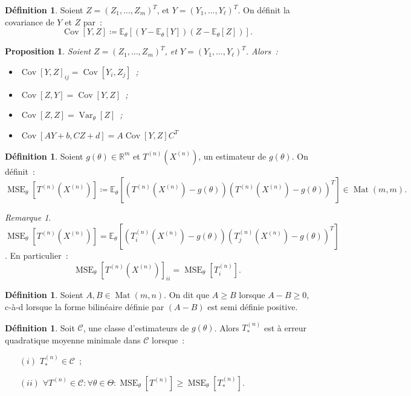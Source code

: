 \documentclass{report}
\DeclareMathOperator{\Mat}{Mat}
\DeclareMathOperator{\Var}{Var}
\DeclareMathOperator{\Cov}{Cov}
\DeclareMathOperator{\MSE}{MSE}
\newcommand{\E}{\mathbb E}
\newcommand{\R}{\mathbb R}
\newcommand{\Xn}{{X^{(n)}}}
\newcommand{\Tn}{{T^{(n)}}}
\newcommand{\TnXn}{{\Tn(\Xn)}}
\newtheorem{prp}[thm]{Proposition}
\theoremstyle{definition}
\newtheorem{déf}[thm]{Définition}
\theoremstyle{remark}
\newtheorem*{rmq}{Remarque}
\begin{document}
			\begin{déf} Soient $Z = (Z_1, \ldots, Z_m)^T$, et $Y = (Y_1, \ldots, Y_\ell)^T$. On définit la covariance de $Y$ et $Z$ par~:
			\[\Cov[Y, Z] \coloneqq \E_\theta\left[(Y-\E_\theta[Y])(Z-\E_\theta[Z])\right].\]
			\end{déf}

			\begin{prp} Soient $Z = (Z_1, \ldots, Z_m)^T$, et $Y = (Y_1, \ldots, Y_\ell)^T$. Alors~:
			\begin{itemize}
				\item $\Cov[Y, Z]_{ij} = \Cov[Y_i, Z_j]$~;
				\item $\Cov[Z, Y] = \Cov[Y, Z]$~;
				\item $\Cov[Z, Z] = \Var_\theta[Z]$~;
				\item $\Cov[AY+b, CZ+d] = A\Cov[Y, Z]C^T$
			\end{itemize}
			\end{prp}

			\begin{déf} Soient $g(\theta) \in \R^m$ et $\TnXn$, un estimateur de $g(\theta)$. On définit~:
			\[\MSE_\theta[\TnXn] \coloneqq \E_\theta\left[(\TnXn - g(\theta))(\TnXn - g(\theta))^T\right] \in \Mat(m, m).\]
			\end{déf}

			\begin{rmq} $\MSE_\theta[\TnXn] = \E_\theta\left[\left(T_i^{(n)}(\Xn)-g(\theta)\right)\left(T_j^{(n)}(\Xn)-g(\theta)\right)^T\right]$. En particulier~:
			\[\MSE_\theta[\TnXn]_{ii} = \MSE_\theta[T_i^{(n)}].\]
			\end{rmq}

			\begin{déf} Soient $A, B \in \Mat(m, n)$. On dit que $A \geq B$ lorsque $A-B \geq 0$, c-à-d lorsque la forme bilinéaire définie par $(A-B)$ est semi définie
			positive.
			\end{déf}

			\begin{déf} Soit $\mathcal C$, une classe d'estimateurs de $g(\theta)$. Alors $T_*^{(n)}$ est à erreur quadratique moyenne minimale dans $\mathcal C$
			lorsque~:
			\begin{itemize}
				\item[$(i)$]  $T_*^{(n)} \in \mathcal C$~;
				\item[$(ii)$] $\forall \Tn \in \mathcal C : \forall \theta \in \Theta : \MSE_\theta[\Tn] \geq \MSE_\theta[T_*^{(n)}]$.
			\end{itemize}
			\end{déf}
\end{document}
